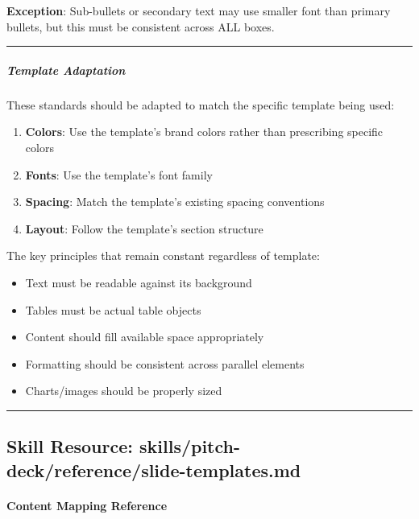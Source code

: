 \documentclass[11pt]{article}
\begin{document}
\textbf{Exception}: Sub-bullets or secondary text may use smaller font than primary bullets, but this must be consistent across ALL boxes.


\vspace{0.5em}\hrule\vspace{0.5em}

\subparagraph{Template Adaptation}\mbox{}\par

These standards should be adapted to match the specific template being used:


\begin{enumerate}[leftmargin=*,itemsep=2pt,topsep=2pt]
\item {} \textbf{Colors}: Use the template's brand colors rather than prescribing specific colors
\item {} \textbf{Fonts}: Use the template's font family
\item {} \textbf{Spacing}: Match the template's existing spacing conventions
\item {} \textbf{Layout}: Follow the template's section structure
\end{enumerate}

The key principles that remain constant regardless of template:

\begin{itemize}[leftmargin=*,itemsep=2pt,topsep=2pt]
\item {} Text must be readable against its background
\item {} Tables must be actual table objects
\item {} Content should fill available space appropriately
\item {} Formatting should be consistent across parallel elements
\item {} Charts/images should be properly sized
\end{itemize}

\vspace{0.8em}\hrule\vspace{0.8em}

\subsection{Skill Resource: skills/pitch-deck/reference/slide-templates.md}\label{file:skills-pitch-deck-reference-slide-templates.md}

\paragraph{Content Mapping Reference}\mbox{}\par
\end{document}
